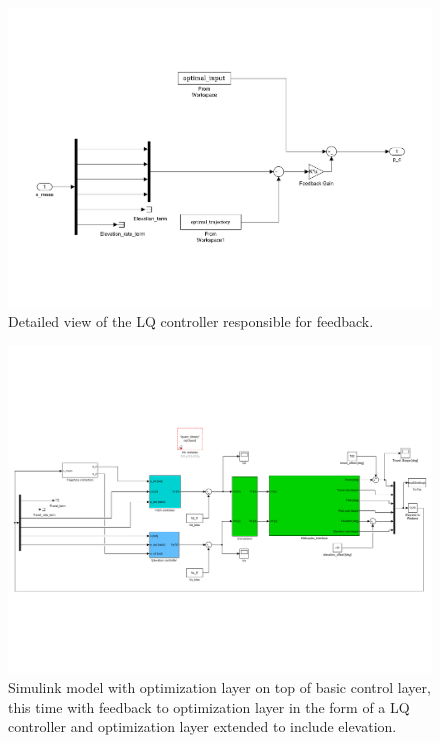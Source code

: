 \begin{figure}[!htb]
	\centering
	\includegraphics[trim=10 100 10 100, clip, width=\textwidth]{figures/simulink/ex3_feedback.pdf}
	\caption{Detailed view of the LQ controller responsible for feedback.}
\label{fig:sim_ex3_fb}
\end{figure}

\begin{figure}[!htb]
	\centering
	\includegraphics[trim=10 100 10 100, clip, width=\textwidth]{figures/simulink/ex4.pdf}
	\caption{Simulink model with optimization layer on top of basic control layer, this time with feedback to optimization layer in the form of a LQ controller and optimization layer extended to include elevation.}
\label{fig:sim_ex4}
\end{figure}

